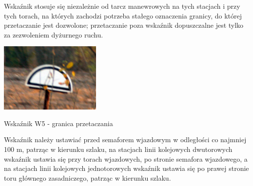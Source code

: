 Wskaźnik stosuje się niezależnie od tarcz manewrowych na tych stacjach i przy tych torach, na których zachodzi potrzeba stałego oznaczenia granicy, do której przetaczanie jest dozwolone; przetaczanie poza wskaźnik dopuszczalne jest tylko za zezwoleniem dyżurnego ruchu. 
	\begin{marginfigure}
	\includegraphics[width=5cm]{skryptkierownik-img/skryptkierownik-img009.jpg}
	\caption{Wskaźnik W5 - granica przetaczania}
\end{marginfigure}
Wskaźnik należy ustawiać przed semaforem wjazdowym w odległości co najmniej 100 m, patrząc w kierunku szlaku, na stacjach linii kolejowych dwutorowych wskaźnik ustawia się przy torach wjazdowych, po stronie semafora wjazdowego, a na stacjach linii kolejowych jednotorowych wskaźnik ustawia się po prawej stronie toru głównego zasadniczego, patrząc w kierunku szlaku.


